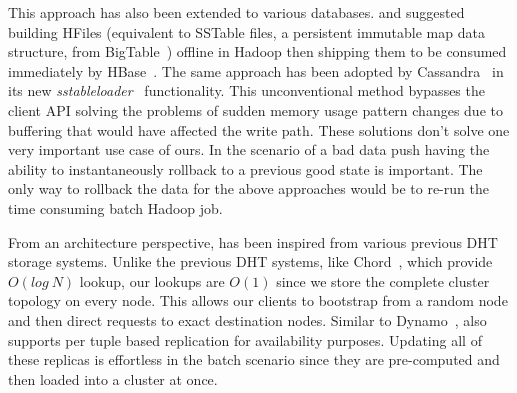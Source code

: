 This approach has also been extended to various databases. \cite{konstantinou} and \cite{barbuzzi} suggested building HFiles (equivalent to SSTable files, a persistent immutable map data structure, from BigTable~\cite{bigtable}) offline in Hadoop then shipping them to be consumed immediately by HBase~\cite{hbase}. The same approach has been adopted by Cassandra~\cite{cassandra} in its new \emph{sstableloader}~\cite{cassandra_bulk} functionality. This unconventional method bypasses the client API solving the problems of sudden memory usage pattern changes due to buffering that would have affected the write path. These solutions don't solve one very important use case of ours. In the scenario of a bad data push having the ability to instantaneously rollback to a previous good state is important. The only way to rollback the data for the above approaches would be to re-run the time consuming batch Hadoop job.

From an architecture perspective, \projectname{} has been inspired from various previous DHT storage systems. Unlike the previous DHT systems, like Chord~\cite{chord}, which provide $O(log~N)$ lookup, our lookups are $O(1)$ since we store the complete cluster topology on every node. This allows our clients to bootstrap from a random node and then direct requests to exact destination nodes. Similar to Dynamo~\cite{dynamo}, \projectname{} also supports per tuple based replication for availability purposes. Updating all of these replicas is effortless in the batch scenario since they are pre-computed and then loaded into a \projectname{} cluster at once. 


